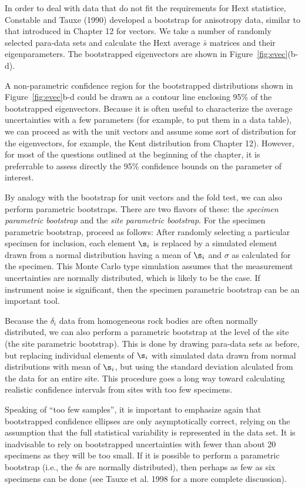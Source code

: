  In order to deal with data that do not fit the requirements for Hext statistice, 
 Constable and Tauxe (1990) 
developed a bootstrap for anisotropy data,  similar to that introduced in Chapter 12 for vectors.  We take a number of randomly selected para-data sets  and calculate the Hext  average   $\bar s$ matrices and their eigenparameters.  The bootstrapped eigenvectors are shown    in Figure~\ref{fig:evec}(b-d). 

A non-parametric confidence region for the bootstrapped distributions
 shown in Figure~\ref{fig:evec}b-d could  be drawn as 
a contour line enclosing 95\% of the bootstrapped eigenvectors.  
Because it is often useful to characterize the average uncertainties with
a few parameters (for example, to put them in a data table),
 we can proceed as with the unit vectors and assume
some sort of distribution for the eigenvectors, for example,  the Kent distribution from Chapter 12).  However, for most of the questions outlined
at the beginning of the chapter, it is preferrable to assess directly  the 
95\% confidence bounds on the parameter of interest.


By analogy with  the bootstrap for unit vectors and the 
fold test, we can also
perform  parametric bootstraps.  There are two flavors of these:  the {\it specimen parametric bootstrap} and the {\it site parametric bootstrap}.  For the specimen parametric bootstrap,  proceed as follows:
After randomly selecting
a particular specimen for inclusion, each element $\s_i$ is replaced by a
simulated element drawn from a normal distribution having a mean of $\s_i$ and 
$\sigma$ as calculated for the specimen.
This Monte Carlo type simulation  assumes
that the measurement uncertainties are normally distributed, which 
 is likely to be the case.  If instrument noise is significant, then
the specimen parametric bootstrap can be an important tool. 


Because the $\delta_i$ data from homogeneous rock bodies are often normally 
distributed, we can also perform a parametric bootstrap at the level of
the site (the {site parametric bootstrap}).  This is done by drawing para-data sets 
as before, but replacing individual elements of $\s_i$ with simulated data
drawn from normal distributions with mean of $\s_i$, but using the standard deviation 
alculated from the data for an entire site.  
This procedure goes a long way
toward calculating realistic confidence intervals from sites with too few
specimens.  

Speaking of ``too few samples'',  it is important to  emphasize again that bootstrapped confidence ellipses are only asymptotically correct, relying on the assumption that the full statistical variability is represented in the data set.  It is inadvisable to rely on bootstrapped uncertainties with fewer than about 20 specimens as they will be too small.  If it is possible to perform a parametric bootstrap (i.e., the $\delta$s are normally distributed), then perhaps as few as six specimens can be done (see 
Tauxe et al. 1998 for a more complete discussion).  \nocite{tauxe98b}     


